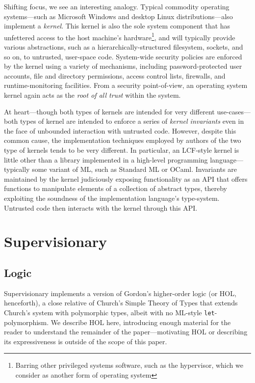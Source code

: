 \documentclass[a4paper, 10pt]{article}
\begin{document}
Shifting focus, we see an interesting analogy.
Typical commodity operating systems---such as Microsoft Windows and desktop Linux distributions---also implement a \emph{kernel}.
This kernel is also the sole system component that has unfettered access to the host machine's hardware\footnote{Barring other privileged systems software, such as the hypervisor, which we consider as another form of operating system}, and will typically provide various abstractions, such as a hierarchically-structured filesystem, sockets, and so on, to untrusted, user-space code.
System-wide security policies are enforced by the kernel using a variety of mechanisms, including password-protected user accounts, file and directory permissions, access control lists, firewalls, and runtime-monitoring facilities.
From a security point-of-view, an operating system kernel again acts as the \emph{root of all trust} within the system.

At heart---though both types of kernels are intended for very different use-cases---both types of kernel are intended to enforce a series of \emph{kernel invariants} even in the face of unbounded interaction with untrusted code.
However, despite this common cause, the implementation techniques employed by authors of the two type of kernels tends to be very different.
In particular, an LCF-style kernel is little other than a library implemented in a high-level programming language---typically some variant of ML, such as Standard ML or OCaml.
Invariants are maintained by the kernel judiciously exposing functionality as an API that offers functions to manipulate elements of a collection of abstract types, thereby exploiting the soundness of the implementation language's type-system.
Untrusted code then interacts with the kernel through this API.

\section{Supervisionary}
\label{sect.supervisionary}

\subsection{Logic}
\label{subsect.logic}

Supervisionary implements a version of Gordon's higher-order logic (or HOL, henceforth), a close relative of Church's Simple Theory of Types that extends Church's system with polymorphic types, albeit with no ML-style \texttt{let}-polymorphism.
We describe HOL here, introducing enough material for the reader to understand the remainder of the paper---motivating HOL or describing its expressiveness is outside of the scope of this paper.
\end{document}
